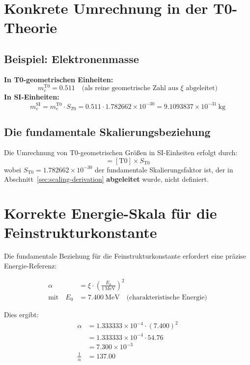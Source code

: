 \documentclass[12pt,a4paper]{article}
\begin{document}
	\section{Konkrete Umrechnung in der T0-Theorie}
	\label{sec:umrechnung}
	
	\subsection{Beispiel: Elektronenmasse}
	\textbf{In T0-geometrischen Einheiten:}
	\begin{equation}
		m_e^{\mathrm{T0}} = 0.511 \quad \text{(als reine geometrische Zahl aus $\xi$ abgeleitet)}
	\end{equation}
	\textbf{In SI-Einheiten:}
	\begin{equation}
		m_e^{\mathrm{SI}} = m_e^{\mathrm{T0}} \cdot S_{T0} = 0.511 \cdot 1.782662 \times 10^{-30} = 9.1093837 \times 10^{-31}~\mathrm{kg}
	\end{equation}
	
	\subsection{Die fundamentale Skalierungsbeziehung}
	Die Umrechnung von T0-geometrischen Größen in SI-Einheiten erfolgt durch:
	\begin{equation}
		[\mathrm{SI}] = [\mathrm{T0}] \times S_{\text{T0}}
	\end{equation}
	wobei $S_{\text{T0}} = 1.782662 \times 10^{-30}$ der fundamentale Skalierungsfaktor ist, der in Abschnitt~\ref{sec:scaling-derivation} \textbf{abgeleitet} wurde, nicht definiert.
	
	\section{Korrekte Energie-Skala für die Feinstrukturkonstante}
	
	Die fundamentale Beziehung für die Feinstrukturkonstante erfordert eine präzise Energie-Referenz:
	
	\begin{align}
		\alpha &= \xi \cdot \left( \frac{E_0}{1~\mathrm{MeV}} \right)^2 \\
		\text{mit} \quad E_0 &= 7.400~\mathrm{MeV} \quad \text{(charakteristische Energie)}
	\end{align}
	
	Dies ergibt:
	\begin{align}
		\alpha &= 1.333333 \times 10^{-4} \cdot (7.400)^2 \\
		&= 1.333333 \times 10^{-4} \cdot 54.76 \\
		&= 7.300 \times 10^{-3} \\
		\frac{1}{\alpha} &= 137.00
	\end{align}
	
\end{document}
